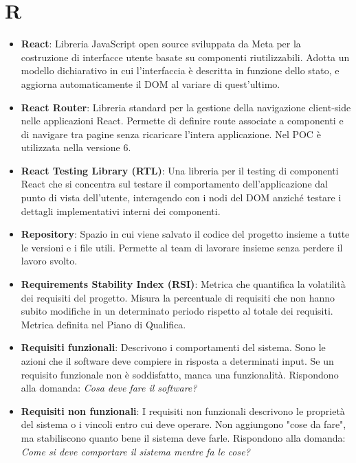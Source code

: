 \documentclass[11pt,a4paper]{article}
\begin{document}
\section*{R}
\begin{itemize}
\item \textbf{React}: Libreria JavaScript open source sviluppata da 
Meta per la costruzione di interfacce utente basate su componenti 
riutilizzabili. Adotta un modello dichiarativo in cui l'interfaccia è descritta in funzione dello stato, e aggiorna automaticamente il DOM al variare di quest'ultimo.

\item \textbf{React Router}: Libreria standard per la gestione della 
navigazione client-side nelle applicazioni React. Permette di definire route associate a componenti e di navigare tra pagine senza ricaricare l'intera applicazione. Nel POC è utilizzata nella versione 6.

\item \textbf{React Testing Library (RTL)}: Una libreria per il testing di componenti React che si concentra sul testare il comportamento dell'applicazione dal punto di vista dell'utente, interagendo con i nodi del DOM anziché testare i dettagli implementativi interni dei componenti.

\item \textbf{Repository}: Spazio in cui viene salvato il codice del progetto insieme a tutte le versioni e i file utili. Permette al team di lavorare insieme senza perdere il lavoro svolto.

\item \textbf{Requirements Stability Index (RSI)}: Metrica che quantifica la volatilità dei requisiti del progetto. Misura la percentuale di requisiti che non hanno subito modifiche in un determinato periodo rispetto al totale dei requisiti. Metrica definita nel Piano di Qualifica.

\item \textbf{Requisiti funzionali}: Descrivono i comportamenti del sistema. Sono le azioni che il software deve compiere in risposta a determinati input. Se un requisito funzionale non è soddisfatto, manca una funzionalità. Rispondono alla domanda: \textit{Cosa deve fare il software?}

\item \textbf{Requisiti non funzionali}: I requisiti non funzionali descrivono le proprietà del sistema o i vincoli entro cui deve operare. Non aggiungono "cose da fare", ma stabiliscono quanto bene il sistema deve farle. Rispondono alla domanda: \textit{Come si deve comportare il sistema mentre fa le cose?}


\end{itemize}
\end{document}
